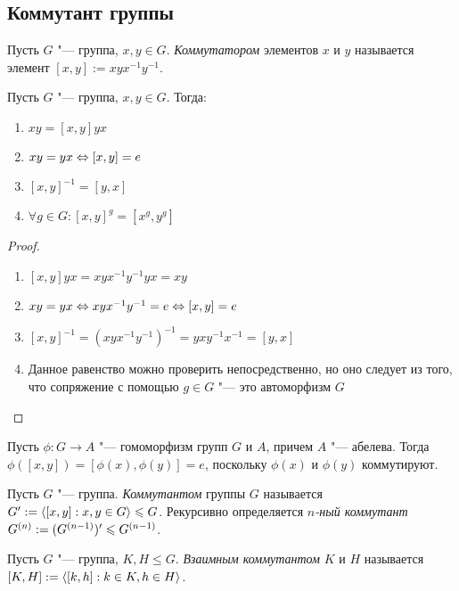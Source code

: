 \subsection{Коммутант группы}

\begin{definition}
	Пусть $G$ "--- группа, $x, y \in G$. \textit{Коммутатором} элементов $x$ и $y$ называется элемент $[x, y] := xyx^{-1}y^{-1}$.
\end{definition}

\begin{proposition} Пусть $G$ "--- группа, $x, y \in G$. Тогда:
	\begin{enumerate}
		\item $xy = [x, y]yx$
		\item $xy = yx \Leftrightarrow [x, y] = e$
		\item $[x, y]^{-1} = [y, x]$
		\item $\forall g \in G: [x, y]^g = [x^g, y^g]$ 
	\end{enumerate}
\end{proposition}

\begin{proof}~
	\begin{enumerate}
		\item $[x, y]yx = xyx^{-1}y^{-1}yx = xy$
		\item $xy = yx \Leftrightarrow xyx^{-1}y^{-1} = e \Leftrightarrow [x, y] = e$
		\item $[x, y]^{-1} = (xyx^{-1}y^{-1})^{-1} = yxy^{-1}x^{-1} = [y, x]$
		\item Данное равенство можно проверить непосредственно, но оно следует из того, что сопряжение с помощью $g \in G$ "--- это автоморфизм $G$
	\end{enumerate}
\end{proof}

\begin{note}
	Пусть $\phi : G \to A$ "--- гомоморфизм групп $G$ и $A$, причем $A$ "--- абелева. Тогда $\phi([x, y]) = [\phi(x), \phi(y)] = e$, поскольку $\phi(x)$ и $\phi(y)$ коммутируют.
\end{note}

\begin{definition}
	Пусть $G$ "--- группа. \textit{Коммутантом} группы $G$ называется $G' := \langle[x, y]: x, y \in G\rangle \leqslant G$. Рекурсивно определяется \textit{$n$-ный коммутант} $G^{(n)} := (G^{(n - 1)})' \hm\le G^{(n - 1)}$.
\end{definition}

\begin{definition}
	Пусть $G$ "--- группа, $K, H \le G$. \textit{Взаимным коммутантом} $K$ и $H$ называется $[K, H] := \langle[k, h]: k \in K,  h \in H\rangle$.
\end{definition}

